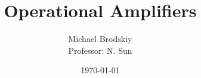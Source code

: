 


\title{Operational Amplifiers}
\date{\today}
\author{Michael Brodskiy\\ \small Professor: N. Sun}



\maketitle

